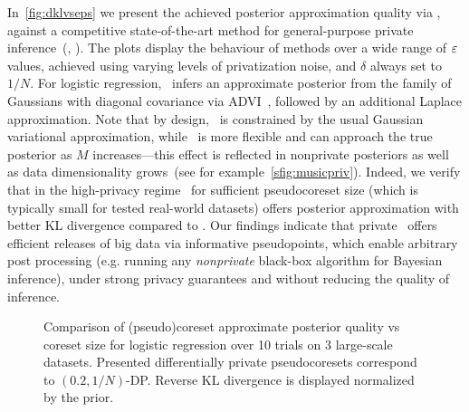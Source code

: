 In~\cref{fig:dklvseps} we present the achieved posterior approximation quality via \dpsvi, against a competitive state-of-the-art method for general-purpose private inference~(\dpvi, \cite{jalko17}). The plots display the
behaviour of methods over a wide range of $\varepsilon$ values, achieved using varying levels of privatization noise, and $\delta$ always set to $1/N$. For logistic regression, \dpvi~infers an approximate posterior from the family of Gaussians with diagonal covariance via ADVI~\citep{kucukelbir17}, followed by an additional Laplace approximation. Note that by design, \dpvi~is constrained by the usual Gaussian variational approximation, while \dpsvi~is more flexible and can approach the true posterior as $ M $ increases---this effect is reflected in nonprivate posteriors as well as data dimensionality grows~(see for example~\cref{sfig:musicpriv}). Indeed, we verify that in the high-privacy regime \dpsvi~for sufficient pseudocoreset size (which is typically small for tested real-world datasets) offers posterior approximation with better KL divergence compared to \dpvi. Our findings indicate that private \psvi~offers efficient releases of big data via informative pseudopoints, which enable arbitrary post processing (e.g. running any \emph{nonprivate} black-box algorithm for Bayesian inference), under strong privacy guarantees and without reducing the quality of inference.


\begin{figure*}[!t]
	\centering
	\begin{subfigure}[b]{.29\textwidth}
		\vspace*{-0.26cm}
		\centerline{}%
		\label{sfig:transactions}
	\end{subfigure}\hfill\qquad
	\centering
	\begin{subfigure}[b]{.29\textwidth}
		\vspace*{-0.26cm}
		\centerline{}%
		\label{sfig:chemreact100}
	\end{subfigure}\hfill\qquad
	\centering
	\begin{subfigure}[b]{.29\textwidth}
		\vspace*{-0.26cm}
		\centerline{}%
		\label{sfig:music}
	\end{subfigure}\hfill\qquad
	\caption{Comparison of (pseudo)coreset approximate posterior quality vs  coreset size for logistic regression over 10 trials on 3 large-scale datasets. Presented differentially private pseudocoresets  correspond to $(0.2, 1/N)$-DP. Reverse KL divergence is displayed normalized by the prior.}
	\label{fig:ls_blogreg_dkl}
\end{figure*}

